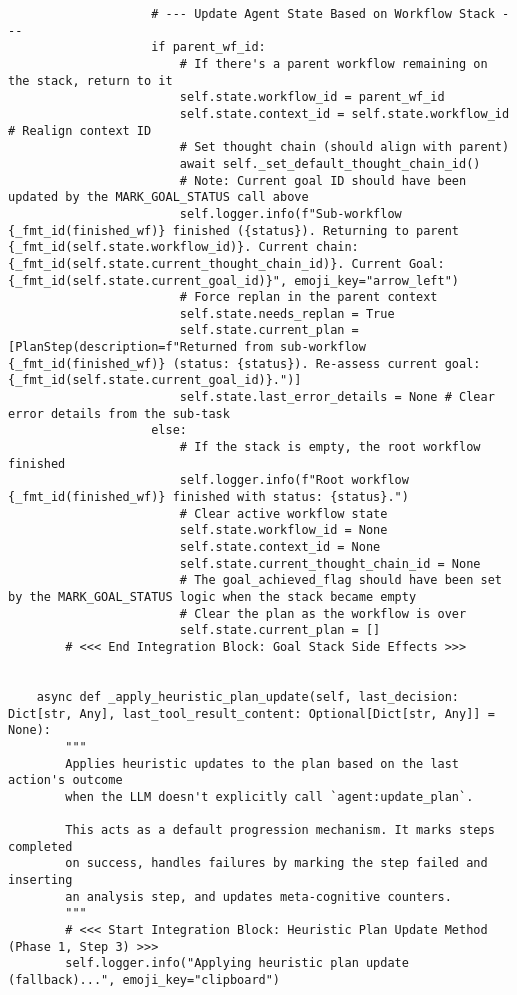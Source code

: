 \documentclass[12pt,a4paper]{article}
\begin{document}
\begin{pageablecode}
\begin{verbatim}
                    # --- Update Agent State Based on Workflow Stack ---
                    if parent_wf_id:
                        # If there's a parent workflow remaining on the stack, return to it
                        self.state.workflow_id = parent_wf_id
                        self.state.context_id = self.state.workflow_id # Realign context ID
                        # Set thought chain (should align with parent)
                        await self._set_default_thought_chain_id()
                        # Note: Current goal ID should have been updated by the MARK_GOAL_STATUS call above
                        self.logger.info(f"Sub-workflow {_fmt_id(finished_wf)} finished ({status}). Returning to parent {_fmt_id(self.state.workflow_id)}. Current chain: {_fmt_id(self.state.current_thought_chain_id)}. Current Goal: {_fmt_id(self.state.current_goal_id)}", emoji_key="arrow_left")
                        # Force replan in the parent context
                        self.state.needs_replan = True
                        self.state.current_plan = [PlanStep(description=f"Returned from sub-workflow {_fmt_id(finished_wf)} (status: {status}). Re-assess current goal: {_fmt_id(self.state.current_goal_id)}.")]
                        self.state.last_error_details = None # Clear error details from the sub-task
                    else:
                        # If the stack is empty, the root workflow finished
                        self.logger.info(f"Root workflow {_fmt_id(finished_wf)} finished with status: {status}.")
                        # Clear active workflow state
                        self.state.workflow_id = None
                        self.state.context_id = None
                        self.state.current_thought_chain_id = None
                        # The goal_achieved_flag should have been set by the MARK_GOAL_STATUS logic when the stack became empty
                        # Clear the plan as the workflow is over
                        self.state.current_plan = []
        # <<< End Integration Block: Goal Stack Side Effects >>>


    async def _apply_heuristic_plan_update(self, last_decision: Dict[str, Any], last_tool_result_content: Optional[Dict[str, Any]] = None):
        """
        Applies heuristic updates to the plan based on the last action's outcome
        when the LLM doesn't explicitly call `agent:update_plan`.

        This acts as a default progression mechanism. It marks steps completed
        on success, handles failures by marking the step failed and inserting
        an analysis step, and updates meta-cognitive counters.
        """
        # <<< Start Integration Block: Heuristic Plan Update Method (Phase 1, Step 3) >>>
        self.logger.info("Applying heuristic plan update (fallback)...", emoji_key="clipboard")


\end{verbatim}
\end{pageablecode}
\end{document}
